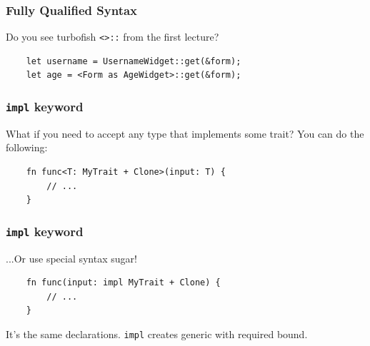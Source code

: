 \documentclass[aspectratio=1610,t]{beamer}
\begin{document}

\begin{frame}[fragile]
\frametitle{Fully Qualified Syntax}
Do you see turbofish \texttt{<>::} from the first lecture?

\begin{verbatim}
    let username = UsernameWidget::get(&form);
    let age = <Form as AgeWidget>::get(&form);
\end{verbatim}


\end{frame}


\begin{frame}[fragile]
\frametitle{\texttt{impl} keyword}
What if you need to accept any type that implements some trait? You can do the following:

\begin{verbatim}
    fn func<T: MyTrait + Clone>(input: T) {
        // ...
    }
\end{verbatim}
\end{frame}


\begin{frame}[fragile]
\frametitle{\texttt{impl} keyword}
...Or use special syntax sugar!

\begin{verbatim}
    fn func(input: impl MyTrait + Clone) {
        // ...
    }
\end{verbatim}

It's the same declarations. \texttt{impl} creates generic with required bound.
\end{frame}

\end{document}
